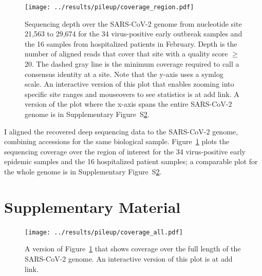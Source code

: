 \documentclass[9pt,twocolumn,twoside]{gsajnl_modified}
\begin{document}
\begin{figure}[]
\centering
\texttt{[image: ../results/pileup/coverage\_region.pdf]}
\caption{Sequencing depth over the SARS-CoV-2 genome from nucleotide site 21,563 to 29,674 for the 34 virus-positive early outbreak samples and the 16 samples from hospitalized patients in February.
Depth is the number of aligned reads that cover that site with a quality score $\ge$20.
The dashed gray line is the minimum coverage required to call a consensus identity at a site.
Note that the y-axis uses a symlog scale.
An interactive version of this plot that enables zooming into specific site ranges and mouseovers to see statistics is at {\color{red} add link}.
A version of the plot where the x-axis spans the entire SARS-CoV-2 genome is in Supplementary Figure~S\ref{suppfig:coverage_all}.
}
\label{fig:coverage}
\end{figure}

I aligned the recovered deep sequencing data to the SARS-CoV-2 genome, combining accessions for the same biological sample.
Figure~\ref{fig:coverage} plots the sequencing coverage over the region of interest for the 34 virus-positive early epidemic samples and the 16 hospitalized patient samples; a comparable plot for the whole genome is in Supplementary Figure~S\ref{suppfig:coverage_all}.



\clearpage
\onecolumn
\renewcommand{\thepage}{S\arabic{page}}
\setcounter{page}{1}

\section{Supplementary Material}

\begin{figure}[h!]
\centering
\texttt{[image: ../results/pileup/coverage\_all.pdf]}
\caption{A version of Figure~\ref{fig:coverage} that shows coverage over the full length of the SARS-CoV-2 genome.
An interactive version of this plot is at {\color{red} add link}.
}
\label{suppfig:coverage_all}
\end{figure}
\end{document}
